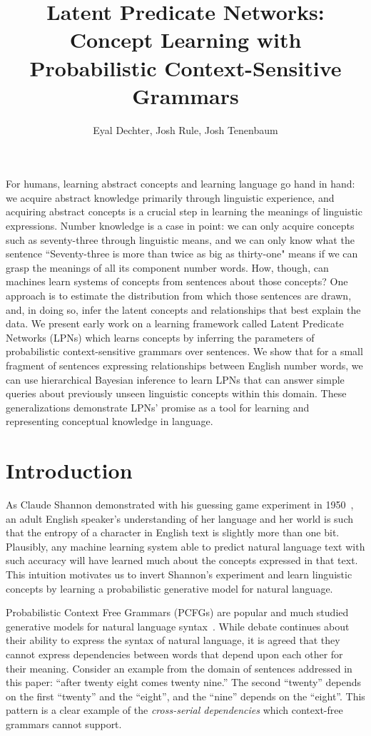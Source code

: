 \documentclass[11pt, twocolumn]{article}
\title{Latent Predicate Networks: Concept Learning with Probabilistic Context-Sensitive Grammars}
\author{Eyal Dechter,  Josh Rule, Josh Tenenbaum}
\begin{document}
\vspace{-10cm}
\maketitle

{\small For humans, learning abstract concepts and learning language
  go hand in hand: we acquire abstract knowledge primarily through
  linguistic experience, and acquiring abstract concepts is a crucial
  step in learning the meanings of linguistic expressions. Number
  knowledge is a case in point: we can only acquire concepts such as
  seventy-three through linguistic means, and we can only know what
  the sentence ``Seventy-three is more than twice as big as thirty-one"
  means if we can grasp the meanings of all its component number
  words. How, though, can machines learn systems of concepts from
  sentences about those concepts? One approach is to estimate the
  distribution from which those sentences are drawn, and, in doing so,
  infer the latent concepts and relationships that best explain the
  data. We present early work on a learning framework called Latent
  Predicate Networks (LPNs) which learns concepts by inferring the
  parameters of probabilistic context-sensitive grammars over
  sentences.  We show that for a small fragment of sentences
  expressing relationships between English number words, we can use
  hierarchical Bayesian inference to learn LPNs that can answer simple
  queries about previously unseen linguistic concepts within this
  domain. These generalizations demonstrate LPNs' promise as a tool
  for learning and representing conceptual knowledge in language.}

\section{Introduction}

As Claude Shannon demonstrated with his guessing game experiment in
1950~\cite{Shannon1950}, an adult English speaker's understanding of
her language and her world is such that the entropy of a character in
English text is slightly more than one bit. Plausibly, any machine
learning system able to predict natural language text with such
accuracy will have learned much about the concepts expressed in that
text. This intuition motivates us to invert Shannon's experiment and
learn linguistic concepts by learning a probabilistic generative model
for natural language.

Probabilistic Context Free Grammars (PCFGs) are popular and much
studied generative models for natural language
syntax~\cite{Someone}. While debate continues about their ability to
express the syntax of natural language, it is agreed that they cannot
express dependencies between words that depend upon each other for
their meaning. Consider an example from the domain of sentences
addressed in this paper: ``after twenty eight comes twenty nine.''
The second ``twenty'' depends on the first ``twenty'' and the
``eight'', and the ``nine'' depends on the ``eight''. This pattern is
a clear example of the \emph{cross-serial dependencies} which
context-free grammars cannot support.
\end{document}

